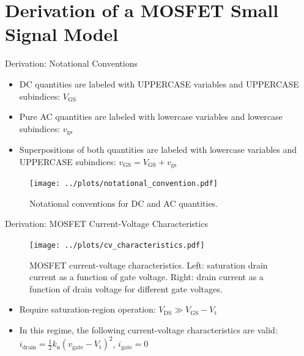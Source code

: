 \section{Derivation of a MOSFET Small Signal Model}
\begin{frame}{Derivation: Notational Conventions}
    \begin{itemize}
        \item DC quantities are labeled with UPPERCASE variables and UPPERCASE subindices: 
        $V_{\mathrm{GS}}$
        \item Pure AC quantities are labeled with lowercase variables and lowercase subindices: 
        $v_{\mathrm{gs}}$
        \item Superpositions of both quantities are labeled with lowercase variables and 
        UPPERCASE subindices: $v_{\mathrm{GS}}=V_{\mathrm{GS}}+v_{\mathrm{gs}}$
    \end{itemize}
    \begin{figure}
        \centering
        \texttt{[image: ../plots/notational\_convention.pdf]}
        \caption{Notational conventions for DC and AC quantities.}
        \label{fig:signal_convention}
    \end{figure}
\end{frame}
    

\begin{frame}{Derivation: MOSFET Current-Voltage Characteristics}
    \vspace{0.5cm}
    \begin{figure}
        \centering
        \texttt{[image: ../plots/cv\_characteristics.pdf]}
        \caption{MOSFET current-voltage characteristics. Left: saturation drain current 
        as a function of gate voltage. Right: drain current as a function of 
        drain voltage for different gate voltages.}
        \label{fig:mosfet_characteristics}
    \end{figure}
    \begin{itemize}
        \item Require saturation-region operation: $V_{\mathrm{DS}}\gg V_{\mathrm{GS}}-V_{\mathrm{t}}$
        \item In this regime, the following current-voltage characteristics are valid:
        $i_{\mathrm{drain}}=\frac{1}{2}k_{\mathrm{n}}(v_{\mathrm{gate}}-V_{\mathrm{t}})^{2}$, 
        $i_{\mathrm{gate}}=0$
    \end{itemize}
\end{frame}

